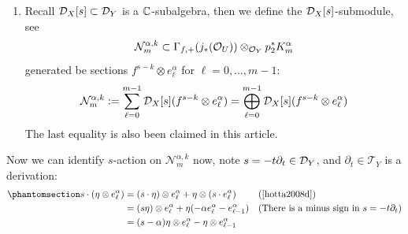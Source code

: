\begin{definition}
\begin{enumerate}
        \item Recall $\mathcal{D}_X[s]\subset \mathcal{D}_Y$ is a $\mathbb{C}$-subalgebra, then we define the $\mathcal{D}_X[s]$-submodule, see \cite[Sect.~3]{Wu2020ComparisonNearbyCyclesBfunctions}
              \[
                  \mathcal{N}_m^{\alpha,k}\subset \Gamma_{f,+}(j_*(\mathcal{O}_U)) \otimes_{\mathcal{O}_Y} p_2^* K_m^{\alpha}
              \]
              generated be sections $f^{s-k} \otimes e_\ell^{\alpha}$ for $\ell=0,\dots,m-1$:
              \begin{align*}
                  \mathcal{N}_m^{\alpha,k} := \sum_{\ell=0}^{m-1} \mathcal{D}_X[s] (f^{s-k} \otimes e_\ell^{\alpha}) = \bigoplus_{\ell=0}^{m-1} \mathcal{D}_X[s] (f^{s-k} \otimes e_\ell^{\alpha})
              \end{align*}
              The last equality is also been claimed in this article.
    \end{enumerate}
\end{definition}

Now we can identify $s$-action on $\mathcal{N}_m^{\alpha,k}$ now, note $s = -t\partial_t \in \mathcal{D}_Y$, and $\partial_t\in\mathcal{T}_Y$ is a derivation:
\begin{align*}\phantomsection\label{eq:s_action_on_N_m_alpha_k}
    s \cdot (\eta \otimes e_\ell^{\alpha}) & = (s \cdot \eta) \otimes e_\ell^{\alpha} + \eta \otimes (s \cdot e_\ell^{\alpha})     &  & \text{(\cite[Proposition~1.2.9.(i)]{hotta2008d})}  \\
                                           & = (s\eta) \otimes e_\ell^{\alpha}+\eta(-\alpha e^{\alpha}_{\ell}-e^{\alpha}_{\ell-1}) &  & \text{(There is a minus sign in $s=-t\partial_t$)} \\
                                           & =(s-\alpha)\eta \otimes e^{\alpha}_{\ell}-\eta \otimes e^{\alpha}_{\ell-1}
\end{align*}

